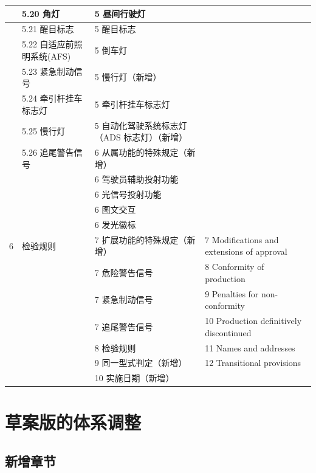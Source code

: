 \begin{table}[H]
\begin{tabularx}{\textwidth}{|c|X|X|X|}
\hline
  & 5.20 角灯              & 5 昼间行驶灯           & \\
\hline
  & 5.21 醒目标志          & 5 醒目标志             & \\
\hline
  & 5.22 自适应前照明系统(AFS) & 5 倒车灯          & \\
\hline
  & 5.23 紧急制动信号      & 5 慢行灯（新增）        & \\
\hline
  & 5.24 牵引杆挂车标志灯  & 5 牵引杆挂车标志灯      & \\
\hline
  & 5.25 慢行灯            & \textcolor{themegreen}{5 自动化驾驶系统标志灯（ADS 标志灯）（新增）} & \\
\hline
  & 5.26 追尾警告信号      & 6 从属功能的特殊规定（新增） & \\
\hline
  &                        & 6 驾驶员辅助投射功能     & \\
\hline
  &                        & 6 光信号投射功能         & \\
\hline
  &                        & 6 图文交互               & \\
\hline
  &                        & 6 发光徽标               & \\
\hline
6 & 检验规则               & 7 扩展功能的特殊规定（新增） & 7 Modifications and extensions of approval \\
\hline
  &                        & 7 危险警告信号           & 8 Conformity of production \\
\hline
  &                        & 7 紧急制动信号           & 9 Penalties for non-conformity \\
\hline
  &                        & 7 追尾警告信号           & 10 Production definitively discontinued \\
\hline
  &                        & 8 检验规则               & 11 Names and addresses \\
\hline
  &                        & \textcolor{themegreen}{9 同一型式判定（新增）} & 12 Transitional provisions \\
\hline
  &                        & \textcolor{themegreen}{10 实施日期（新增）}  & \\
\hline
\end{tabularx}
\end{table}

\section{草案版的体系调整}

\subsection{新增章节}


